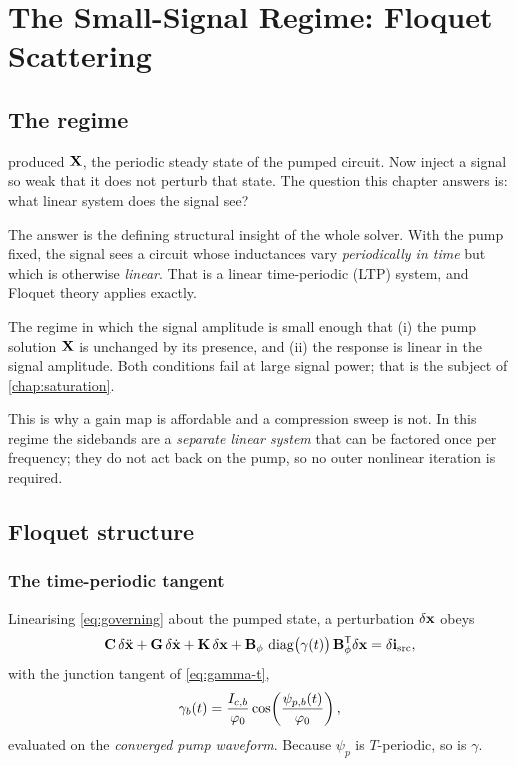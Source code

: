 \chapter{The Small-Signal Regime: Floquet Scattering}
\label{chap:floquet}

\section{The regime}

 produced $\mathbf{X}$, the periodic steady state of the pumped
circuit. Now inject a signal so weak that it does not perturb that state. The
question this chapter answers is: what linear system does the signal see?

The answer is the defining structural insight of the whole solver. With the pump
fixed, the signal sees a circuit whose inductances vary \emph{periodically in
time} but which is otherwise \emph{linear}. That is a linear time-periodic (LTP)
system, and Floquet theory applies exactly.

\begin{definition}
The regime in which the signal amplitude is small enough that (i) the pump
solution $\mathbf{X}$ is unchanged by its presence, and (ii) the response is linear in
the signal amplitude. Both conditions fail at large signal power; that is the
subject of \cref{chap:saturation}.
\end{definition}

This is why a gain map is affordable and a compression sweep is not. In this
regime the sidebands are a \emph{separate linear system} that can be factored
once per frequency; they do not act back on the pump, so no outer nonlinear
iteration is required.

\section{Floquet structure}

\subsection{The time-periodic tangent}

Linearising \eqref{eq:governing} about the pumped state, a perturbation
$\delta\mathbf{x}$ obeys
\begin{equation}
  \mathbf{C}\,\delta\ddot{\mathbf{x}}
  + \mathbf{G}\,\delta\dot{\mathbf{x}}
  + \mathbf{K}\,\delta\mathbf{x}
  + \mathbf{B}_{\phi}\,\operatorname{diag}\bigl(\gamma(t)\bigr)\,\mathbf{B}_{\phi}^{\mathsf T}\delta\mathbf{x}
  = \delta\mathbf{i}_{\mathrm{src}},
  \label{eq:linearised}
\end{equation}
with the junction tangent of \eqref{eq:gamma-t},
\begin{equation}
  \gamma_b(t) = \frac{I_{c,b}}{\varphi_{0}}
                \cos\!\left(\frac{\psi_{p,b}(t)}{\varphi_{0}}\right),
\end{equation}
evaluated on the \emph{converged pump waveform}. Because $\psi_p$ is
$T$-periodic, so is $\gamma$.

